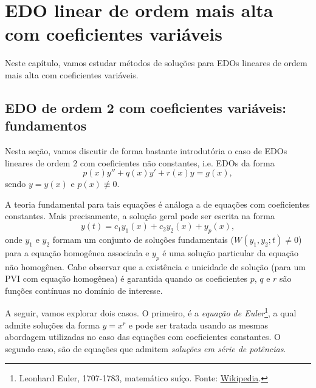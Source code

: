 
\chapter{EDO linear de ordem mais alta com coeficientes variáveis}\label{cap_edolcv}
\thispagestyle{fancy}

Neste capítulo, vamos estudar métodos de soluções para EDOs lineares de ordem mais alta com coeficientes variáveis.

\section{EDO de ordem 2 com coeficientes variáveis: fundamentos}\label{cap_edolcv_sec_edo2lcvfun}

Nesta seção, vamos discutir de forma bastante introdutória o caso de EDOs lineares de ordem 2 com coeficientes não constantes, i.e. EDOs da forma
\begin{equation}
  p(x)y'' + q(x)y' + r(x)y = g(x),
\end{equation}
sendo $y = y(x)$ e $p(x)\not\equiv 0$.

A teoria fundamental para tais equações é análoga a de equações com coeficientes constantes. Mais precisamente, a solução geral pode ser escrita na forma
\begin{equation}
  y(t) = c_1y_1(x) + c_2y_2(x) + y_p(x),
\end{equation}
onde $y_1$ e $y_2$ formam um conjunto de soluções fundamentais ($W(y_1,y_2;t)\neq 0$) para a equação homogênea associada e $y_p$ é uma solução particular da equação não homogênea. Cabe observar que a existência e unicidade de solução (para um PVI com equação homogênea) é garantida quando os coeficientes $p$, $q$ e $r$ são funções contínuas no domínio de interesse.

A seguir, vamos explorar dois casos. O primeiro, é a \emph{equação de Euler}\footnote{Leonhard Euler, 1707-1783, matemático suíço. Fonte: \href{https://en.wikipedia.org/wiki/Leonhard_Euler}{Wikipedia}.}, a qual admite soluções da forma $y = x^r$ e pode ser tratada usando as mesmas abordagem utilizadas no caso das equações com coeficientes constantes. O segundo caso, são de equações que admitem \emph{soluções em série de potências}.

